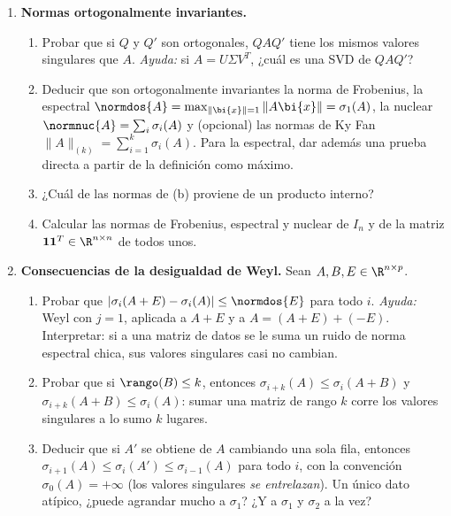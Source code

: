 \begin{enumerate}[leftmargin=*,label=\textbf{\thechapter.\arabic*},ref=\thechapter.\arabic*,itemsep=4pt]
\item {} \textbf{Normas ortogonalmente invariantes.}\label{pca-ej:invariantes}
\begin{enumerate}[label=(\alph*)]
\item Probar que si $Q$ y $Q'$ son ortogonales, $QAQ'$ tiene los mismos
valores singulares que $A$. \emph{Ayuda:} si $A=U\Sigma V^T$, ¿cuál es
una SVD de $QAQ'$?
\item Deducir que son ortogonalmente invariantes la norma de Frobenius, la
espectral $\normdos{A}=\max_{\|\bi{x}\|=1}\|A\bi{x}\|=\sigma_1(A)$, la nuclear
$\normnuc{A}=\sum_i\sigma_i(A)$ y (opcional) las normas de Ky Fan
$\|A\|_{(k)}=\sum_{i=1}^k\sigma_i(A)$. Para la espectral, dar además una
prueba directa a partir de la definición como máximo.
\item ¿Cuál de las normas de (b) proviene de un producto interno?
\item Calcular las normas de Frobenius, espectral y nuclear de $I_n$ y de la
matriz $\mathbf 1\mathbf 1^T\in\R^{n\times n}$ de todos unos.
\end{enumerate}

\item {} \textbf{Consecuencias de la desigualdad de Weyl.}\label{pca-ej:weyl}
Sean $A,B,E\in\R^{n\times p}$.
\begin{enumerate}[label=(\alph*)]
\item Probar que $|\sigma_i(A+E)-\sigma_i(A)|\le\normdos{E}$ para todo $i$.
\emph{Ayuda:} Weyl con $j=1$, aplicada a $A+E$ y a $A=(A+E)+(-E)$.
Interpretar: si a una matriz de datos se le suma un ruido de norma espectral
chica, sus valores singulares casi no cambian.
\item Probar que si $\rango(B)\le k$, entonces $\sigma_{i+k}(A)\le\sigma_i(A+B)$
y $\sigma_{i+k}(A+B)\le\sigma_i(A)$: sumar una matriz de rango $k$ corre los
valores singulares a lo sumo $k$ lugares.
\item Deducir que si $A'$ se obtiene de $A$ cambiando una sola fila, entonces
$\sigma_{i+1}(A)\le\sigma_i(A')\le\sigma_{i-1}(A)$ para todo $i$, con la
convención $\sigma_0(A)=+\infty$ (los valores singulares
\emph{se entrelazan}). Un único dato atípico, ¿puede agrandar mucho a
$\sigma_1$? ¿Y a $\sigma_1$ y $\sigma_2$ a la vez?
\end{enumerate}


\end{enumerate}
